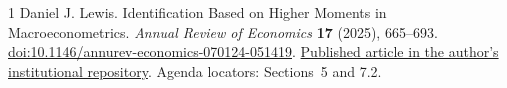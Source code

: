 \documentclass[11pt,a4paper]{article}
\numberwithin{equation}{section}
\begin{document}
\begin{thebibliography}{1}
Daniel J. Lewis.
\newblock Identification Based on Higher Moments in Macroeconometrics.
\newblock \emph{Annual Review of Economics} \textbf{17} (2025), 665--693.
\newblock \href{https://doi.org/10.1146/annurev-economics-070124-051419}
{doi:10.1146/annurev-economics-070124-051419}.
\newblock \href{https://discovery.ucl.ac.uk/id/eprint/10208055/1/Lewis_annurev-economics-070124-051419.pdf}
{Published article in the author's institutional repository}.
\newblock Agenda locators: Sections~5 and 7.2.
\end{thebibliography}
\end{document}
